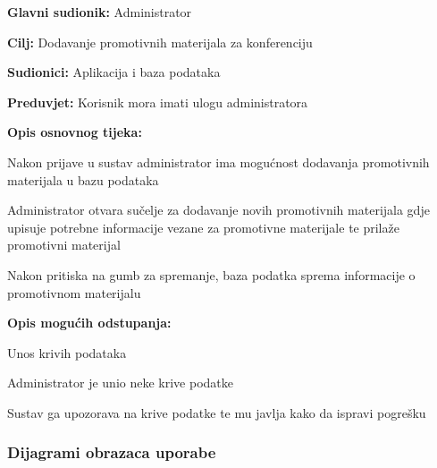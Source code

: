 				\noindent {}
				\begin{packed_item}

					\item \textbf{Glavni sudionik: } Administrator
					\item  \textbf{Cilj:} Dodavanje promotivnih materijala za konferenciju
					\item  \textbf{Sudionici:} Aplikacija i baza podataka
					\item  \textbf{Preduvjet:} Korisnik mora imati ulogu administratora
					\item  \textbf{Opis osnovnog tijeka:}

					\item[] \begin{packed_enum}

						\item Nakon prijave u sustav administrator ima mogućnost dodavanja promotivnih materijala u bazu podataka
						\item Administrator otvara sučelje za dodavanje novih promotivnih materijala gdje upisuje potrebne informacije vezane za promotivne materijale te prilaže promotivni materijal
						\item Nakon pritiska na gumb za spremanje, baza podatka sprema informacije o promotivnom materijalu
					\end{packed_enum}

					\item  \textbf{Opis mogućih odstupanja:}

					\item[] \begin{packed_item}

						\item[2.a] Unos krivih podataka
						\item[] \begin{packed_enum}

							\item Administrator je unio neke krive podatke
							\item Sustav ga upozorava na krive podatke te mu javlja kako da ispravi pogrešku

						\end{packed_enum}


					\end{packed_item}
				\end{packed_item}


				\subsubsection{Dijagrami obrazaca uporabe}

